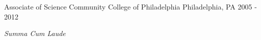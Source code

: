 \begin{cventries}
  \cventry
    {Associate of Science} %
    {Community College of Philadelphia} %
    {Philadelphia, PA} %
    {2005 - 2012} %
    {
      \begin{cvitems} %
         \item \textit{Summa Cum Laude}
      \end{cvitems}
    }

\end{cventries}
